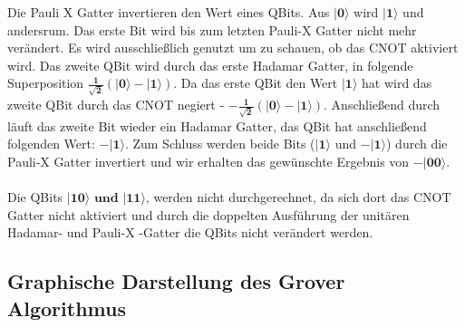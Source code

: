  Die Pauli X Gatter invertieren den Wert eines QBits. Aus $\mathbf{|0\rangle}$ wird $\mathbf{|1\rangle}$ und andersrum. Das erste Bit wird bis zum letzten Pauli-X Gatter nicht mehr verändert. Es wird ausschließlich genutzt um zu schauen, ob das CNOT aktiviert wird. Das zweite QBit wird durch das erste Hadamar Gatter, in folgende Superposition $\mathbf{\frac{1}{\sqrt 2}(|0\rangle - |1\rangle)}$. Da das erste QBit den Wert $\mathbf{|1\rangle}$ hat wird das zweite QBit durch das CNOT negiert - $\mathbf{-\frac{1}{\sqrt 2}(|0\rangle - |1\rangle)}$. Anschließend durch läuft das zweite Bit wieder ein Hadamar Gatter, das QBit hat anschließend folgenden Wert: $\mathbf{-|1\rangle}$.
 Zum Schluss werden beide Bits ($\mathbf{|1\rangle}$ und $\mathbf{-|1\rangle}$) durch die Pauli-X Gatter invertiert und wir erhalten das gewünschte Ergebnis von $\mathbf{-|00\rangle}$.
  \\
  \\
Die QBits $\mathbf{|10\rangle \text{ und }|11\rangle}$, werden nicht durchgerechnet, da sich dort das CNOT Gatter nicht aktiviert und durch die doppelten Ausführung der unitären Hadamar- und Pauli-X -Gatter die QBits nicht verändert werden.

\subsection{Graphische Darstellung des Grover Algorithmus}




